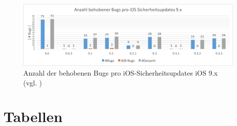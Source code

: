 \begin{figure}[ht!]
        \centering
                \includegraphics[scale=0.55]{Bilder/iOSSicherheitsupdate9.png}
        \caption{Anzahl der behobenen Bugs pro iOS-Sicherheitsupdates iOS 9.x \newline (vgl. \cite{Apple[7]}) \protect\footnotemark}
        \label{fig:AnalyseiOSSicherheitsupdate9}
\end{figure}
\newpage

\chapter{Tabellen}
\newpage

